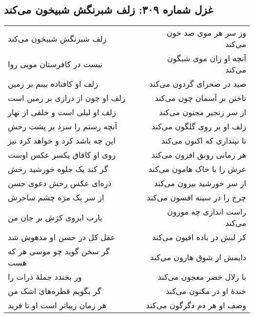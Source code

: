 \begin{center}
\section*{غزل شماره ۳۰۹: زلف شبرنگش شبیخون می‌کند}
\label{sec:309}
\begin{longtable}{l p{0.5cm} r}
زلف شبرنگش شبیخون می‌کند
&&
وز سر هر موی صد خون می‌کند
\\
نیست در کافرستان مویی روا
&&
آنچه او زان موی شبگون می‌کند
\\
زلف او کافتاده بینم بر زمین
&&
صید در صحرای گردون می‌کند
\\
زلف او چون از درازی بر زمین است
&&
تاختن بر آسمان چون می‌کند
\\
زلف او لیلی است و خلقی از نهار
&&
از سر زنجیر مجنون می‌کند
\\
آنچه رستم را سزد بر پشت رخش
&&
زلف او بر روی گلگون می‌کند
\\
این چه باشد کرد و خواهد کرد نیز
&&
تا نپنداری که اکنون می‌کند
\\
روی او کافاق یکسر عکس اوست
&&
هر زمانی رونق افزون می‌کند
\\
گر کند یک جلوه خورشید رخش
&&
عرش را با خاک هامون می‌کند
\\
ذره‌ای عکس رخش دعوی حسن
&&
از سر خورشید بیرون می‌کند
\\
از سر یک مژه چشم ساحرش
&&
چرخ را در سینه افسون می‌کند
\\
یارب ابروی کژش بر جان من
&&
راست اندازی چه موزون می‌کند
\\
عقل کل در حسن او مدهوش شد
&&
کز لبش در باده افیون می‌کند
\\
گر سخن گوید چو موسی هر که هست
&&
دایمش از شوق هارون می‌کند
\\
ور بخندد جملهٔ ذرات را
&&
با زلال خضر معجون می‌کند
\\
گر بگویم قطره‌های اشک من
&&
خندهٔ او در مکنون می‌کند
\\
هر زمان زیباتر است او تا فرید
&&
وصف او هر دم دگرگون می‌کند
\\
\end{longtable}
\end{center}
